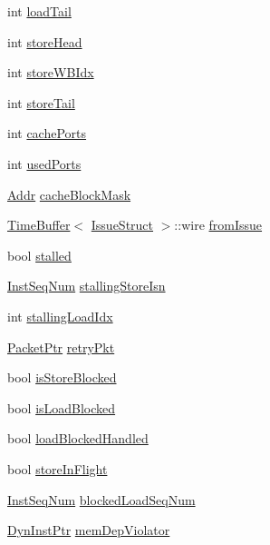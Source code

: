 \begin{DoxyCompactItemize}
int \hyperlink{classLSQUnit_a973a489225da164cc85e690f13c86841}{loadTail}
\item 
int \hyperlink{classLSQUnit_a6e87b6f77102183080ea6ab8599b26a9}{storeHead}
\item 
int \hyperlink{classLSQUnit_a9023e0813d4f3e566d17fb6334a2da02}{storeWBIdx}
\item 
int \hyperlink{classLSQUnit_acd5c7fbb5578b5cb505ffff16bbf6a8b}{storeTail}
\item 
int \hyperlink{classLSQUnit_ab2e23636971c40e7ed945026b2a184e1}{cachePorts}
\item 
int \hyperlink{classLSQUnit_a03435d626b7567ed154de5d7d8c3d419}{usedPorts}
\item 
\hyperlink{base_2types_8hh_af1bb03d6a4ee096394a6749f0a169232}{Addr} \hyperlink{classLSQUnit_af4264b12b32db39099b579e1ed670312}{cacheBlockMask}
\item 
\hyperlink{classTimeBuffer}{TimeBuffer}$<$ \hyperlink{structIssueStruct}{IssueStruct} $>$::wire \hyperlink{classLSQUnit_af6f43373b6586aa8c486538fb076effb}{fromIssue}
\item 
bool \hyperlink{classLSQUnit_a6f8bff553ad30865c7d0c62e05421eb8}{stalled}
\item 
\hyperlink{inst__seq_8hh_a258d93d98edaedee089435c19ea2ea2e}{InstSeqNum} \hyperlink{classLSQUnit_afe1cdcfca6b44c28581d862228adc3da}{stallingStoreIsn}
\item 
int \hyperlink{classLSQUnit_af55bc9000c8b4e4cfcfbd018feca12a7}{stallingLoadIdx}
\item 
\hyperlink{classPacket}{PacketPtr} \hyperlink{classLSQUnit_a314ae93c04b3ca96e79e1b1f39a8e478}{retryPkt}
\item 
bool \hyperlink{classLSQUnit_a89d931c74b63e0b0e7ad856fe9525ff6}{isStoreBlocked}
\item 
bool \hyperlink{classLSQUnit_a95dc31b4ce3ebcb6b9d75a510b3a128c}{isLoadBlocked}
\item 
bool \hyperlink{classLSQUnit_a2c1620029c162c7180e523b089e56ed5}{loadBlockedHandled}
\item 
bool \hyperlink{classLSQUnit_aec79dbfe7cf50cf3d047cad7ee8fa157}{storeInFlight}
\item 
\hyperlink{inst__seq_8hh_a258d93d98edaedee089435c19ea2ea2e}{InstSeqNum} \hyperlink{classLSQUnit_a3fca34b247fd8d081557578f8ca60fe3}{blockedLoadSeqNum}
\item 
\hyperlink{classLSQUnit_a028ce10889c5f6450239d9e9a7347976}{DynInstPtr} \hyperlink{classLSQUnit_a270a20c3fa52139e0538288275db9d22}{memDepViolator}
\item 

\end{DoxyCompactItemize}
